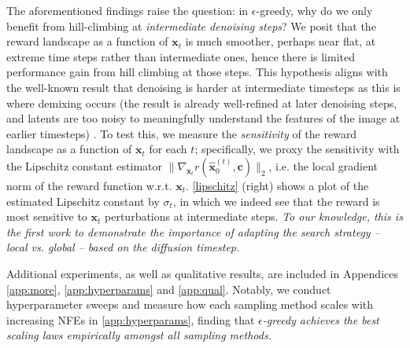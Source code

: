 \documentclass{article}
\newcommand{\x}{\mathbf{x}}
\begin{document}
The aforementioned findings raise the question: in $\epsilon$-greedy, why do we only benefit from hill-climbing at \textit{intermediate denoising steps}? We posit that the reward landscape as a function of $\x_t$ is much smoother, perhaps near flat, at extreme time steps rather than intermediate ones, hence there is limited performance gain from hill climbing at those steps. This hypothesis aligns with the well-known result that denoising is harder at intermediate timesteps as this is where demixing occurs (the result is already well-refined at later denoising steps, and latents are too noisy to meaningfully understand the features of the image at earlier timesteps) \citep{karras2022elucidatingdesignspacediffusionbased, hang2024improvednoiseschedulediffusion, wang2025closerlooktimesteps}. To test this, we measure the \textit{sensitivity} of the reward landscape as a function of $\x_t$ for each $t$; specifically, we proxy the sensitivity with the Lipschitz constant estimator $\|\nabla_{\x_t} r(\hat{\x}_0^{(t)}, \mathbf{c})\|_2$, i.e. the local gradient norm of the reward function w.r.t. $\x_t$. \autoref{lipschitz} (right) shows a plot of the estimated Lipschitz constant by $\sigma_t$, in which we indeed see that the reward is most sensitive to $\x_t$ perturbations at intermediate steps. \textit{To our knowledge, this is the first work to demonstrate the importance of adapting the search strategy -- local vs. global -- based on the diffusion timestep.}

Additional experiments, as well as qualitative results, are included in Appendices \ref{app:more}, \ref{app:hyperparams} and \ref{app:qual}. Notably, we conduct hyperparameter sweeps and measure how each sampling method scales with increasing NFEs in \autoref{app:hyperparams}, finding that \textit{$\epsilon$-greedy achieves the best scaling laws empirically amongst all sampling methods.}
\end{document}
